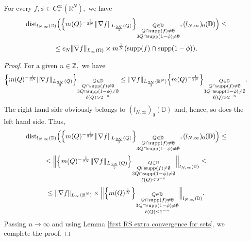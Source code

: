 \documentclass{amsart}
\begin{document}
\begin{lemma}\label{first RS with r convergence lemma} For every $f,\phi\in C^{\infty}_c(\mathbb{R}^N),$ we have
$${\rm dist}_{l_{N,\infty}(\mathbb{D})}\Big(\Big\{m(Q)^{-\frac1{2N}}\|\nabla f\|_{L_{\frac{2N}{3}}(Q)}\Big\}_{\substack{Q\in\mathbb{D}\\ Q\cap {\rm supp}(f)\neq\emptyset\\ 3Q\cap {\rm supp}(1-\phi)\neq\emptyset}},(l_{N,\infty})_0(\mathbb{D})\Big)\leq$$
$$\leq c_N\|\nabla f\|_{L_{\infty}(\Omega)}\times m^{\frac1N}({\rm supp}(f)\cap{\rm supp}(1-\phi)).$$
\end{lemma}
\begin{proof} For a given $n\in\mathbb{Z},$ we have
$$\Big\{m(Q)^{-\frac1{2N}}\|\nabla f\|_{L_{\frac{2N}{3}}(Q)}\Big\}_{\substack{Q\in\mathbb{D}\\ Q\cap {\rm supp}(f)\neq\emptyset\\ 3Q\cap {\rm supp}(1-\phi)\neq\emptyset\\ \ell(Q)>2^{-n}}}\leq\|\nabla f\|_{L_{\frac{2N}{3}}(\mathbb{R}^N)}\Big\{m(Q)^{-\frac1{2N}}\Big\}_{\substack{Q\in\mathbb{D}\\  Q\cap {\rm supp}(f)\neq\emptyset\\ 3Q\cap {\rm supp}(1-\phi)\neq\emptyset\\ \ell(Q)>2^{-n}}}.$$
The right hand side obviously belongs to $(l_{N,\infty})_0(\mathbb{D})$ and, hence, so does the left hand side. Thus,
$${\rm dist}_{l_{N,\infty}(\mathbb{D})}\Big(\Big\{m(Q)^{-\frac1{2N}}\|\nabla f\|_{L_{\frac{2N}{3}}(Q)}\Big\}_{\substack{Q\in\mathbb{D}\\ Q\cap {\rm supp}(f)\neq\emptyset\\ 3Q\cap {\rm supp}(1-\phi)\neq\emptyset}},(l_{N,\infty})_0(\mathbb{D})\Big)\leq$$
$$\leq\Big\|\Big\{m(Q)^{-\frac1{2N}}\|\nabla f\|_{L_{\frac{2N}{3}}(Q)}\Big\}_{\substack{Q\in\mathbb{D}\\ Q\cap {\rm supp}(f)\neq\emptyset\\ 3Q\cap {\rm supp}(1-\phi)\neq\emptyset\\ \ell(Q)\leq 2^{-n}}}\Big\|_{l_{N,\infty}(\mathbb{D})}\leq$$
$$\leq\|\nabla f\|_{L_{\infty}(\mathbb{R}^N)}\times\Big\|\Big\{m(Q)^{\frac1N}\Big\}_{\substack{Q\in\mathbb{D}\\ Q\cap {\rm supp}(f)\neq\emptyset\\ 3Q\cap {\rm supp}(1-\phi)\neq\emptyset\\ \ell(Q)\leq 2^{-n}}}\Big\|_{l_{N,\infty}(\mathbb{D})}.$$
Passing $n\to\infty$ and using Lemma \ref{first RS extra convergence for sets}, we complete the proof.
\end{proof}
\end{document}
